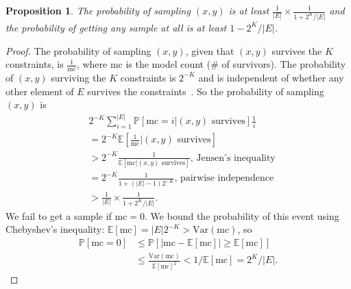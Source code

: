 \documentclass{article}
\newcommand{\Expect}{\mathds{E}} %
\newcommand{\Probability}{\mathds{P}} %
\newtheorem{proposition}{Proposition}
\begin{document}
  \begin{proposition}\label{propositionLowerBound}
    The probability of sampling $(x,y)$ is at least $\frac{1}{|E|}\times \frac{1}{1 + 2^K/|E|}$ and the probability of getting any sample at all is at least $1 - 2^{K}/|E|$.
  \end{proposition}
  \begin{proof}
    The probability of sampling $(x,y)$, given that $(x,y)$ survives the $K$ constraints,
    is $\frac{1}{\text{mc}}$, where $\text{mc}$ is the model count (\# of survivors).
    The probability of $(x,y)$ surviving the $K$ constraints is $2^{-K}$ and is independent of whether any other element of $E$ survives the constraints~\cite{gomes2006near}.
    So the probability of sampling $(x,y)$ is
    \begin{align}
      &      2^{-K}\sum_{i = 1}^{|E|} \Probability\left[ \text{mc} = i | (x,y) \text{ survives}\right] \frac{1}{i}\\
      & = 2^{-K} \Expect\left[\frac{1}{\text{mc}} \vert (x,y) \text{ survives} \right] \\
      &> 2^{-K} \frac{1}{\Expect[\text{mc}|(x,y) \text{ survives}]}\text{, Jensen's inequality}\\
      &= 2^{-K} \frac{1}{1 + (|E|-1)2^{-K}}\text{, pairwise independence}\\
      &> \frac{1}{|E|}\times \frac{1}{1 + 2^K/|E|}.
      \end{align}
    We fail to get a sample if $\text{mc} = 0$. We bound the probability of this event using Chebyshev's inequality: $\Expect [\text{mc}] = |E|2^{-K}>\text{Var}(\text{mc})$, so
    \begin{align}
      \Probability [\text{mc}= 0]&\leq \Probability [ |\text{mc}-\Expect [\text{mc}]|\geq \Expect [\text{mc}]]\\
      &\leq \frac{\text{Var}(\text{mc})}{\Expect [\text{mc}]^2}<1/\Expect[\text{mc}] = 2^K/|E|.
    \end{align}
  \end{proof}
\end{document}
